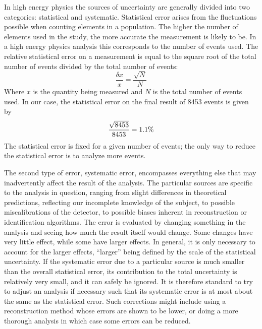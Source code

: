 In high energy physics the sources of uncertainty 
are generally divided into two categories: 
statistical and systematic.  
Statistical error arises from the fluctuations 
possible when counting elements in a population.  
The higher the number of elements used 
in the study, 
the more accurate the measurement is likely to be.  
In a high energy physics analysis 
this corresponds to the number of events used.  
The relative statistical error on a measurement 
is equal to the square root of the total number 
of events divided by the total number of events:
\[
\frac{\delta{}x}{x} = \frac{\sqrt{N}}{N}
\]
Where $x$ is the quantity being measured and 
$N$ is the total number of events used.  
In our case, the statistical error on the final 
result of 8453 events is given by 
\[
\frac{\sqrt{\nevents{}}}{\nevents{}} = 1.1\% %
\]
The statistical error is fixed for a given number 
of events; 
the only way to reduce the statistical error 
is to analyze more events.  

The second type of error, systematic error, 
encompasses everything else that may 
inadvertently 
affect the result of the analysis.  
The particular sources are specific to the analysis 
in question, 
ranging from slight differences 
in theoretical predictions, 
reflecting our incomplete knowledge of the subject, 
to possible miscalibrations of the detector, 
to possible biases inherent in reconstruction 
or identification algorithms.  
The error is evaluated by changing something 
in the analysis and seeing how much the 
result itself would change.  
Some changes have very little effect, 
while some have larger effects.  
In general, it is only necessary to account 
for the larger effects, 
``larger'' being defined by the scale 
of the statistical uncertainty.  
If the systematic error due to a particular 
source is much smaller than the 
overall statistical error, 
its contribution to the total uncertainty 
is relatively very small, 
and it can safely be ignored.  
It is therefore standard to try to adjust 
an analysis if necessary such that its 
systematic error is at most about the same as 
the statistical error.  
Such corrections might include using 
a reconstruction method whose errors 
are shown to be lower, 
or doing a more thorough analysis 
in which case some errors can be reduced.  




